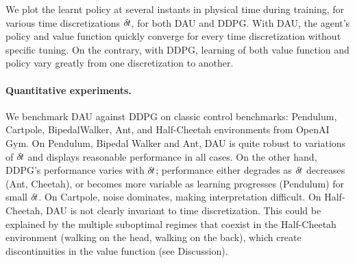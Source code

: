 We plot the learnt policy at several instants in physical time
during training, for various time discretizations
${\delta\hspace{-.1em}t}$, for both DAU and DDPG. With DAU, the agent's policy and value
function quickly converge for every time discretization without specific
tuning. On the contrary, with DDPG, learning of both value function and
policy vary greatly from one discretization to another.

\paragraph{Quantitative experiments.}
We benchmark DAU against DDPG on classic control benchmarks: Pendulum,
Cartpole, BipedalWalker, Ant, and Half-Cheetah environments from OpenAI Gym. On
Pendulum, Bipedal Walker and Ant, DAU is quite robust to variations of
${\delta\hspace{-.1em}t}$ and displays reasonable performance in all cases. On the other hand,
DDPG's performance varies with ${\delta\hspace{-.1em}t}$; performance either degrades as
${\delta\hspace{-.1em}t}$ decreases (Ant, Cheetah), or becomes more variable as learning
progresses (Pendulum) for small ${\delta\hspace{-.1em}t}$. On Cartpole, noise dominates,
making interpretation difficult. On Half-Cheetah, DAU is not clearly
invariant to time discretization. This could be explained by the multiple
suboptimal regimes that coexist in the Half-Cheetah environment (walking on the
head, walking on the back), which create discontinuities in the value
function (see Discussion).

% 


